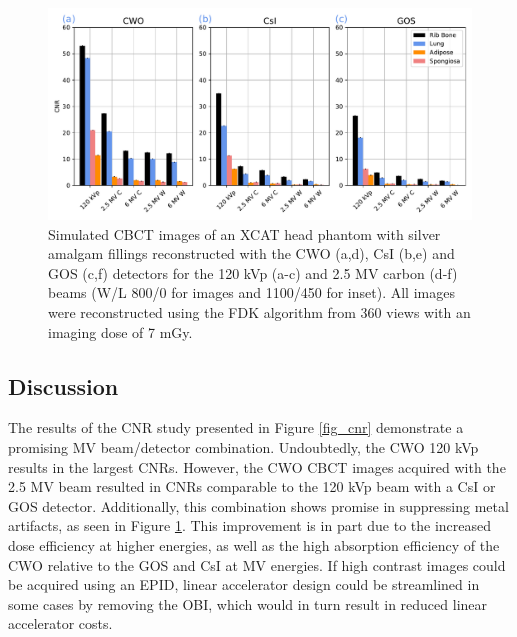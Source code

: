 \begin{figure}[ht!]
   \begin{center}
   \includegraphics[width=0.9\linewidth]{figures/Figure_4.pdf}
  \caption{Simulated CBCT images of an XCAT head phantom with silver amalgam fillings reconstructed with the CWO (a,d), CsI (b,e) and GOS (c,f) detectors for the 120 kVp (a-c) and 2.5 MV carbon (d-f) beams (W/L 800/0 for images and 1100/450 for inset). All images were reconstructed using the FDK algorithm from 360 views with an imaging dose of 7 mGy.
   \label{fig_xcats} 
    }  %
    \end{center}
\end{figure}

\subsection{Discussion}

The results of the CNR study presented in Figure \ref{fig_cnr} demonstrate a promising MV beam/detector combination. Undoubtedly, the CWO 120 kVp results in the largest CNRs. However, the CWO CBCT images acquired with the 2.5 MV beam resulted in CNRs comparable to the 120 kVp beam with a CsI or GOS detector. Additionally, this combination shows promise in suppressing metal artifacts, as seen in Figure \ref{fig_xcats}. This improvement is in part due to the increased dose efficiency at higher energies, as well as the high absorption efficiency of the CWO relative to the GOS and CsI at MV energies. If high contrast images could be acquired using an EPID, linear accelerator design could be streamlined in some cases by removing the OBI, which would in turn result in reduced linear accelerator costs.

